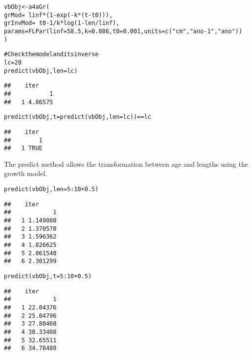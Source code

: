 \documentclass[a4paper,english,10pt]{article}\usepackage[]{graphicx}\usepackage[]{color}
\makeatletter
\newcommand{\hlnum}[1]{\textcolor[rgb]{0.2,0.2,0.2}{#1}}%
\newcommand{\hlstr}[1]{\textcolor[rgb]{0.2,0.2,0.2}{#1}}%
\newcommand{\hlcom}[1]{\textcolor[rgb]{0.2,0.267,0.4}{#1}}%
\newcommand{\hlopt}[1]{\textcolor[rgb]{0.2,0.2,0.2}{#1}}%
\newcommand{\hlstd}[1]{\textcolor[rgb]{0,0,0}{#1}}%
\newcommand{\hlkwb}[1]{\textcolor[rgb]{0.361,0.506,0.596}{#1}}%
\newcommand{\hlkwc}[1]{\textcolor[rgb]{0.361,0.506,0.596}{#1}}%
\newcommand{\hlkwd}[1]{\textcolor[rgb]{0.361,0.506,0.596}{#1}}%
\newenvironment{kframe}{%
 \def\at@end@of@kframe{}%
 \ifinner\ifhmode%
  \def\at@end@of@kframe{\end{minipage}}%
  \begin{minipage}{\columnwidth}%
 \fi\fi%
 \def\FrameCommand##1{\hskip\@totalleftmargin \hskip-\fboxsep
 \colorbox{shadecolor}{##1}\hskip-\fboxsep
     \hskip-\linewidth \hskip-\@totalleftmargin \hskip\columnwidth}%
 \MakeFramed {\advance\hsize-\width
   \@totalleftmargin\z@ \linewidth\hsize
   \@setminipage}}%
 {\par\unskip\endMakeFramed%
 \at@end@of@kframe}
\newenvironment{knitrout}{}{} %
\makeatother
\begin{document}
\begin{knitrout}
\color{fgcolor}\begin{kframe}
\begin{alltt}
\hlstd{vbObj} \hlkwb{<-} \hlkwd{a4aGr}\hlstd{(}
        \hlkwc{grMod}\hlstd{=}\hlopt{~}\hlstd{linf}\hlopt{*}\hlstd{(}\hlnum{1}\hlopt{-}\hlkwd{exp}\hlstd{(}\hlopt{-}\hlstd{k}\hlopt{*}\hlstd{(t}\hlopt{-}\hlstd{t0))),}
        \hlkwc{grInvMod}\hlstd{=}\hlopt{~}\hlstd{t0}\hlopt{-}\hlnum{1}\hlopt{/}\hlstd{k}\hlopt{*}\hlkwd{log}\hlstd{(}\hlnum{1}\hlopt{-}\hlstd{len}\hlopt{/}\hlstd{linf),}
        \hlkwc{params}\hlstd{=}\hlkwd{FLPar}\hlstd{(}\hlkwc{linf}\hlstd{=}\hlnum{58.5}\hlstd{,} \hlkwc{k}\hlstd{=}\hlnum{0.086}\hlstd{,} \hlkwc{t0}\hlstd{=}\hlnum{0.001}\hlstd{,} \hlkwc{units}\hlstd{=}\hlkwd{c}\hlstd{(}\hlstr{"cm"}\hlstd{,}\hlstr{"ano-1"}\hlstd{,}\hlstr{"ano"}\hlstd{))}
\hlstd{)}

\hlcom{# Check the model and its inverse}
\hlstd{lc}\hlkwb{=}\hlnum{20}
\hlkwd{predict}\hlstd{(vbObj,} \hlkwc{len}\hlstd{=lc)}
\end{alltt}
\begin{verbatim}
##    iter
##           1
##   1 4.86575
\end{verbatim}
\begin{alltt}
\hlkwd{predict}\hlstd{(vbObj,} \hlkwc{t}\hlstd{=}\hlkwd{predict}\hlstd{(vbObj,} \hlkwc{len}\hlstd{=lc))}\hlopt{==}\hlstd{lc}
\end{alltt}
\begin{verbatim}
##    iter
##        1
##   1 TRUE
\end{verbatim}
\end{kframe}
\end{knitrout}

The predict method allows the transformation between age and lengths using the growth model.

\begin{knitrout}
\color{fgcolor}\begin{kframe}
\begin{alltt}
\hlkwd{predict}\hlstd{(vbObj,} \hlkwc{len}\hlstd{=}\hlnum{5}\hlopt{:}\hlnum{10}\hlopt{+}\hlnum{0.5}\hlstd{)}
\end{alltt}
\begin{verbatim}
##    iter
##            1
##   1 1.149080
##   2 1.370570
##   3 1.596362
##   4 1.826625
##   5 2.061540
##   6 2.301299
\end{verbatim}
\begin{alltt}
\hlkwd{predict}\hlstd{(vbObj,} \hlkwc{t}\hlstd{=}\hlnum{5}\hlopt{:}\hlnum{10}\hlopt{+}\hlnum{0.5}\hlstd{)}
\end{alltt}
\begin{verbatim}
##    iter
##            1
##   1 22.04376
##   2 25.04796
##   3 27.80460
##   4 30.33408
##   5 32.65511
##   6 34.78488
\end{verbatim}
\end{kframe}
\end{knitrout}
\end{document}
